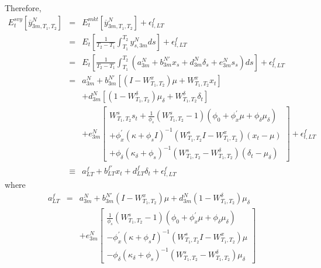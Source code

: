 \documentclass{article}
\begin{document}
Therefore,%
\begin{eqnarray*}
E_{t}^{svy}\left[ \overline{y}_{3m,T_{1},T_{2}}^{N}\right]  &=&E_{t}^{mkt}%
\left[ \overline{y}_{3m,T_{1},T_{2}}^{N}\right] +\epsilon _{t,LT}^{f} \\
&=&E_{t}\left[ \frac{1}{T_{2}-T_{1}}\int_{T_{1}}^{T_{2}}y_{s,3m}^{N}ds\right]
+\epsilon _{t,LT}^{f} \\
&=&E_{t}\left[ \frac{1}{T_{2}-T_{1}}\int_{T_{1}}^{T_{2}}\left(
a_{3m}^{N}+b_{3m}^{N\prime }x_{s}+d_{3m}^{N}\delta
_{s}+e_{3m}^{N}s_{s}\right) ds\right] +\epsilon _{t,LT}^{f} \\
&=&a_{3m}^{N}+b_{3m}^{N\prime }\left[ \left( I-W_{T_{1},T_{2}}^{x}\right)
\mu +W_{T_{1},T_{2}}^{x}x_{t}\right]  \\
&&+d_{3m}^{N}\left[ \left( 1-W_{T_{1},T_{2}}^{\delta }\right) \mu _{\delta
}+W_{T_{1},T_{2}}^{\delta }\delta _{t}\right]  \\
&&+e_{3m}^{N}\left[ 
\begin{array}{c}
W_{T_{1},T_{2}}^{s}s_{t}+\frac{1}{\phi _{s}}\left(
W_{T_{1},T_{2}}^{s}-1\right) \left( \phi _{0}+\phi _{x}^{\prime }\mu +\phi
_{\delta }\mu _{\delta }\right)  \\ 
+\phi _{x}^{\prime }\left( \kappa +\phi _{s}I\right) ^{-1}\left(
W_{T_{1},T_{2}}^{s}I-W_{T_{1},T_{2}}^{x}\right) \left( x_{t}-\mu \right)  \\ 
+\phi _{\delta }\left( \kappa _{\delta }+\phi _{s}\right) ^{-1}\left(
W_{T_{1},T_{2}}^{s}-W_{T_{1},T_{2}}^{\delta }\right) \left( \delta _{t}-\mu
_{\delta }\right) 
\end{array}%
\right] +\epsilon _{t,LT}^{f} \\
&\equiv &a_{LT}^{f}+b_{LT}^{f\prime }x_{t}+d_{LT}^{f}\delta _{t}+\epsilon
_{t,LT}^{f}
\end{eqnarray*}%
where%
\begin{eqnarray*}
a_{LT}^{f} &=&a_{3m}^{N}+b_{3m}^{N\prime }\left(
I-W_{T_{1},T_{2}}^{x}\right) \mu +d_{3m}^{N}\left( 1-W_{T_{1},T_{2}}^{\delta
}\right) \mu _{\delta } \\
&&+e_{3m}^{N}\left[ 
\begin{array}{c}
\frac{1}{\phi _{s}}\left( W_{T_{1},T_{2}}^{s}-1\right) \left( \phi _{0}+\phi
_{x}^{\prime }\mu +\phi _{\delta }\mu _{\delta }\right)  \\ 
-\phi _{x}^{\prime }\left( \kappa +\phi _{s}I\right) ^{-1}\left(
W_{T_{1},T_{2}}^{s}I-W_{T_{1},T_{2}}^{x}\right) \mu  \\ 
-\phi _{\delta }\left( \kappa _{\delta }+\phi _{s}\right) ^{-1}\left(
W_{T_{1},T_{2}}^{s}-W_{T_{1},T_{2}}^{\delta }\right) \mu _{\delta }%
\end{array}%
\right] 
\end{eqnarray*}%
\end{document}
